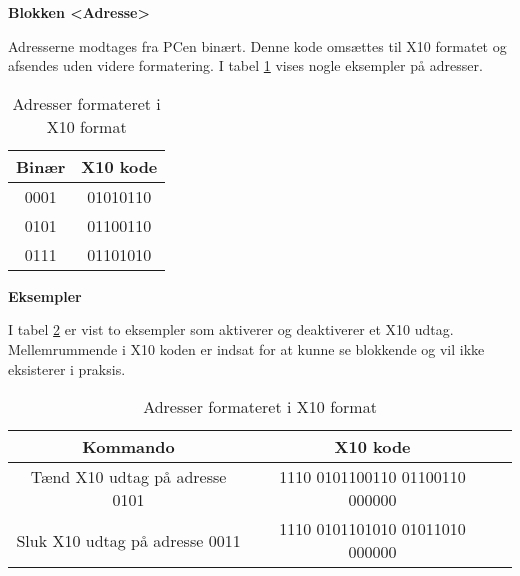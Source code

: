 \textbf{Blokken <Adresse>}

Adresserne modtages fra PCen binært. Denne kode omsættes til X10 formatet og afsendes uden videre formatering.
I tabel \ref{tabel:X10Adresser} vises nogle eksempler på adresser.

\begin{table}[h]
\caption{Adresser formateret i X10 format}
\centering
\begin{tabular}{|c|c|}
\hline 
\textbf{Binær} & \textbf{X10 kode} \\ 
\hline 
0001 & 01010110 \\ 
\hline 
0101 & 01100110 \\ 
\hline
0111 & 01101010 \\
\hline
\end{tabular}
\label{tabel:X10Adresser}
\end{table} 

\textbf{Eksempler}

I tabel \ref{tabel:X10Eksempler} er vist to eksempler som aktiverer og deaktiverer et X10 udtag. Mellemrummende i X10 koden er indsat for at kunne se blokkende og vil ikke eksisterer i praksis.

\begin{table}[h]
\caption{Adresser formateret i X10 format}
\centering
\begin{tabular}{|c|c|c|}
\hline 
\textbf{Kommando} & \textbf{X10 kode} \\ 
\hline 
Tænd X10 udtag på adresse 0101 & 1110 0101100110 01100110 000000 \\ 
\hline 
Sluk X10 udtag på adresse 0011 & 1110 0101101010 01011010 000000 \\ 
\hline
\end{tabular}
\label{tabel:X10Eksempler}
\end{table} 
